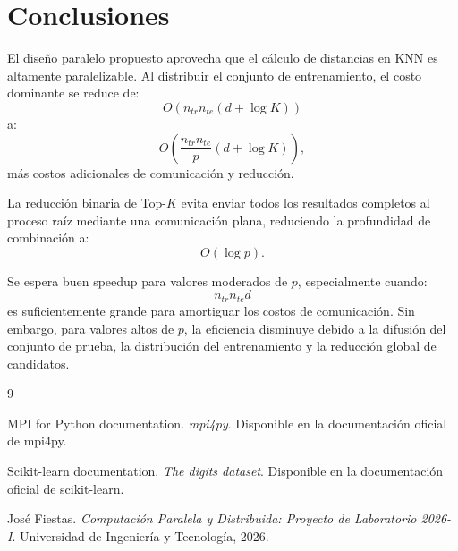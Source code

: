\documentclass[11pt,a4paper]{article}
\begin{document}
\section{Conclusiones}

El diseño paralelo propuesto aprovecha que el cálculo de distancias en KNN es altamente
paralelizable. Al distribuir el conjunto de entrenamiento, el costo dominante se reduce de:
\[
O(n_{tr}n_{te}(d+\log K))
\]
a:
\[
O\left(
\frac{n_{tr}n_{te}}{p}(d+\log K)
\right),
\]
más costos adicionales de comunicación y reducción.

La reducción binaria de Top-$K$ evita enviar todos los resultados completos al proceso raíz
mediante una comunicación plana, reduciendo la profundidad de combinación a:
\[
O(\log p).
\]

Se espera buen speedup para valores moderados de $p$, especialmente cuando:
\[
n_{tr}n_{te}d
\]
es suficientemente grande para amortiguar los costos de comunicación. Sin embargo, para valores
altos de $p$, la eficiencia disminuye debido a la difusión del conjunto de prueba, la distribución
del entrenamiento y la reducción global de candidatos.

\begin{thebibliography}{9}

MPI for Python documentation.
\textit{mpi4py}. Disponible en la documentación oficial de mpi4py.

Scikit-learn documentation.
\textit{The digits dataset}. Disponible en la documentación oficial de scikit-learn.

José Fiestas.
\textit{Computación Paralela y Distribuida: Proyecto de Laboratorio 2026-I}.
Universidad de Ingeniería y Tecnología, 2026.

\end{thebibliography}
\end{document}
